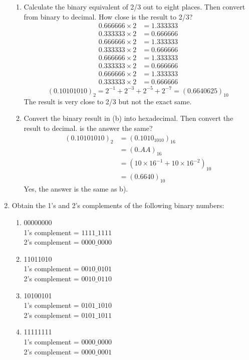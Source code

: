 \documentclass[12pt]{book}
\begin{document}
\begin{enumerate}
\begin{enumerate}
        \item Calculate the binary equivalent of 2/3 out to eight places. Then convert from binary to decimal. How close is the result to 2/3?
        \begin{align*}
            0.666666\times2 &= 1.333333\\
            0.333333\times2 &= 0.666666\\
            0.666666\times2 &= 1.333333\\
            0.333333\times2 &= 0.666666\\
            0.666666\times2 &= 1.333333\\
            0.333333\times2 &= 0.666666\\
            0.666666\times2 &= 1.333333\\
            0.333333\times2 &= 0.666666
        \end{align*}
        $$(0.10101010)_2 = 2^{-1}+2^{-3}+2^{-5}+2^{-7} = (0.6640625)_{10}$$
        The result is very close to 2/3 but not the exact same.\\
        \item Convert the binary result in (b) into hexadecimal. Then convert the result to decimal. is the answer the same?
        \begin{align*}
            (0.10101010)_2 &= (0.1010_1010)_{16}\\
            &= (0.AA)_{16}\\
            &= (10\times16^{-1}+10\times16^{-2})_{10}\\
            &= (0.6640)_{10}
        \end{align*}
        Yes, the answer is the same as b).
    \end{enumerate}
    
    \newpage
    
    \item Obtain the 1's and 2's complements of the following binary numbers:
    \begin{enumerate}
        \item 00000000\\
        1's complement = $1111\_1111$\\
        2's complement = $0000\_0000$\\
        \item 11011010\\
        1's complement = $0010\_0101$\\
        2's complement = $0010\_0110$\\
        \item 10100101\\
        1's complement = $0101\_1010$\\
        2's complement = $0101\_1011$\\
        \item 11111111\\
        1's complement = $0000\_0000$\\
        2's complement = $0000\_0001$\\
    \end{enumerate}
    

\end{enumerate}
\end{document}
